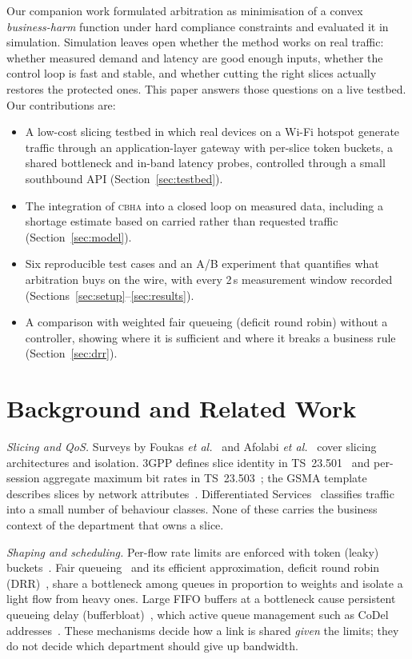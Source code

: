 \documentclass[conference]{IEEEtran}
\newcommand{\cbha}{\textsc{cbha}}
\begin{document}
Our companion work formulated arbitration as minimisation of a convex \emph{business-harm} function under hard compliance constraints and evaluated it in simulation. Simulation leaves open whether the method works on real traffic: whether measured demand and latency are good enough inputs, whether the control loop is fast and stable, and whether cutting the right slices actually restores the protected ones. This paper answers those questions on a live testbed. Our contributions are:
\begin{itemize}
\item A low-cost slicing testbed in which real devices on a Wi-Fi hotspot generate traffic through an application-layer gateway with per-slice token buckets, a shared bottleneck and in-band latency probes, controlled through a small southbound API (Section~\ref{sec:testbed}).
\item The integration of \cbha{} into a closed loop on measured data, including a shortage estimate based on carried rather than requested traffic (Section~\ref{sec:model}).
\item Six reproducible test cases and an A/B experiment that quantifies what arbitration buys on the wire, with every 2\,s measurement window recorded (Sections~\ref{sec:setup}--\ref{sec:results}).
\item A comparison with weighted fair queueing (deficit round robin) without a controller, showing where it is sufficient and where it breaks a business rule (Section~\ref{sec:drr}).
\end{itemize}

\section{Background and Related Work}

\textit{Slicing and QoS.} Surveys by Foukas \textit{et al.}~\cite{foukas2017} and Afolabi \textit{et al.}~\cite{afolabi2018} cover slicing architectures and isolation. 3GPP defines slice identity in TS~23.501~\cite{3gpp23501} and per-session aggregate maximum bit rates in TS~23.503~\cite{3gpp23503}; the GSMA template describes slices by network attributes~\cite{gsma_gst}. Differentiated Services~\cite{rfc2475} classifies traffic into a small number of behaviour classes. None of these carries the business context of the department that owns a slice.

\textit{Shaping and scheduling.} Per-flow rate limits are enforced with token (leaky) buckets~\cite{turner1986}. Fair queueing~\cite{demers1989} and its efficient approximation, deficit round robin (DRR)~\cite{shreedhar1996}, share a bottleneck among queues in proportion to weights and isolate a light flow from heavy ones. Large FIFO buffers at a bottleneck cause persistent queueing delay (bufferbloat)~\cite{gettys2012}, which active queue management such as CoDel addresses~\cite{nichols2012}. These mechanisms decide how a link is shared \emph{given} the limits; they do not decide which department should give up bandwidth.
\end{document}
